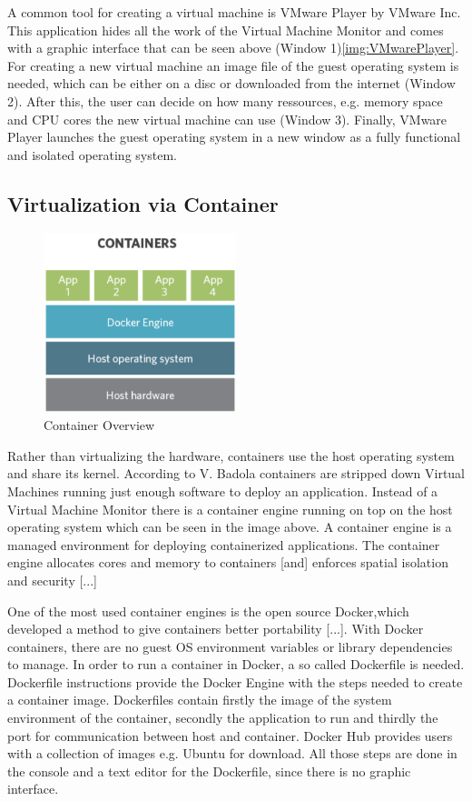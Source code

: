 \documentclass[utf8,biblatex, ngerman, english]{lni}
\begin{document}
A common tool for creating a virtual machine is VMware Player by VMware Inc. This application hides all the work of the Virtual Machine Monitor and comes with a graphic interface that can be seen above (Window 1)\ref{img:VMwarePlayer}. For creating a new virtual machine an image file of the guest operating system is needed, which can be either on a disc or downloaded from the internet (Window 2). After this, the user can decide on how many ressources, e.g. memory space and CPU cores the new virtual machine can use (Window 3). Finally, VMware Player launches the guest operating system in a new window as a fully functional and isolated operating system.

\subsection{Virtualization via Container}

\begin{figure}
  \centering
  \includegraphics[width=0.5\textwidth]{Container.pdf}
  \caption{Container Overview}
  \label{img:container}
\end{figure}

Rather than virtualizing the hardware, containers use the host operating system and share its kernel. According to V. Badola containers are stripped down Virtual Machines running just enough software to deploy an application. \cite{Cv15} Instead of a Virtual Machine Monitor there is a container engine running on top on the host operating system which can be seen in the image above. \glqq A container engine is a managed environment for deploying containerized applications. The container engine allocates cores and memory to containers [and] enforces spatial isolation and security [...] \glqq \cite{VC17}

One of the most used container engines is the open source Docker,\glqq [...] which developed a method to give containers better portability [...]. With Docker containers, there are no guest OS environment variables or library dependencies to manage. \glqq \cite{cz} In order to run a container in Docker, a so called Dockerfile is needed. \glqq Dockerfile instructions provide the Docker Engine with the steps needed to create a container image.\glqq \cite{DW16} Dockerfiles contain firstly the image of the system environment of the container, secondly the application to run and thirdly the port for communication between host and container. Docker Hub provides users with a collection of images e.g. Ubuntu for download. All those steps are done in the console and a text editor for the Dockerfile, since there is no graphic interface.
\end{document}
